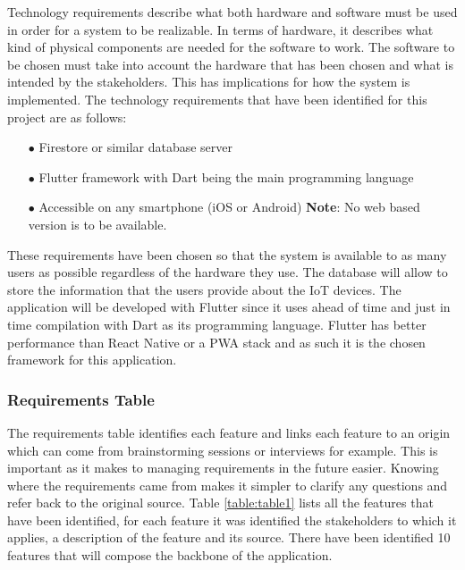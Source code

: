 Technology requirements describe what both hardware and software must be
used in order for a system to be realizable. In terms of hardware, it describes
what kind of physical components are needed for the software to work. The
software to be chosen must take into account the hardware that has been
chosen and what is intended by the stakeholders. This has implications for
how the system is implemented.
\newline
The technology requirements that have been identified for this project are as follows:
\begin{itemize}
    \item[$\bullet$] Firestore or similar database server
    \item[$\bullet$] Flutter framework with Dart being the main programming language
    \item[$\bullet$] Accessible on any smartphone (iOS or Android) \newline \textbf{Note}: No web based version is to be available.
\end{itemize}
These requirements have been chosen so that the system is available to as
many users as possible regardless of the hardware they use. The database
will allow to store the information that the users provide about the IoT
devices. The application will be developed with Flutter since it uses ahead
of time and just in time compilation with Dart as its programming language.
Flutter has better performance than React Native or a PWA stack and as such it is the chosen framework for
this application.

\subsubsection{Requirements Table}

The requirements table identifies each feature and links each feature to an origin
which can come from brainstorming sessions or interviews for example.
This is important as it makes to managing requirements in the future easier.
Knowing where the requirements came from makes it simpler to clarify any questions
and refer back to the original source.
\newline
Table \ref{table:table1} lists all the features that have been identified, for
each feature it was identified the stakeholders to which it applies, a description
of the feature and its source. There have been identified 10 features that will
compose the backbone of the application.


